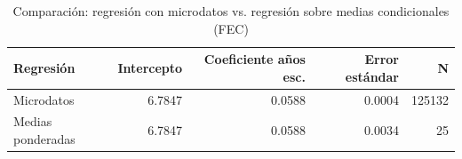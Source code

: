 
\begin{longtable}[t]{lrrrr}
\caption{Comparación: regresión con microdatos vs. regresión sobre medias condicionales (FEC)}\\
\toprule
Regresión & Intercepto & Coeficiente años esc. & Error estándar & N\\
\midrule
Microdatos & 6.7847 & 0.0588 & 0.0004 & 125132\\
Medias ponderadas & 6.7847 & 0.0588 & 0.0034 & 25\\
\bottomrule
\end{longtable}
